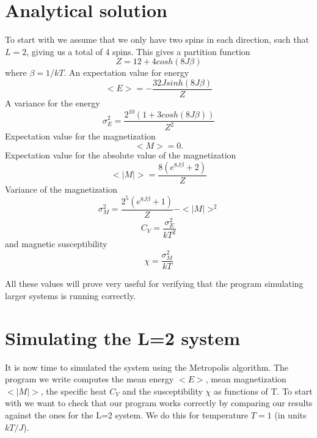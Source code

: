 \documentclass{aa}   %
\begin{document}
\section{Analytical solution}\label{sec:analytical}
To start with we assume that we only have two spins in each direction, such that $L = 2$, giving us a total of 4 spins.
This gives a partition function 
\begin{equation}
 Z = 12 + 4cosh(8J\beta)
\end{equation}
where $\beta = 1/kT$.
An expectation value for energy
\begin{equation}
 <E> = -\frac{32Jsinh(8J\beta)}{Z}
\end{equation}
A variance for the energy
\begin{equation}
 \sigma_E^2 = \frac{2^{10}(1+3cosh(8J\beta))}{Z^2}
\end{equation}
Expectation value for the magnetization
\begin{equation}
 <M> = 0.
\end{equation}
Expectation value for the absolute value of the magnetization
\begin{equation}
 <|M|> = \frac{8(e^{8J\beta}+2)}{Z}
\end{equation}
Variance of the magnetization
\begin{equation}
 \sigma_M^2 = \frac{2^5(e^{8J\beta}+1)}{Z} - <|M|>^2
\end{equation}
\begin{equation}
C_V = \frac{\sigma_E^2}{kT^2}
\end{equation}
and magnetic susceptibility
\begin{equation}
 \chi = \frac{\sigma_M^2}{kT}
\end{equation}

All these values will prove very useful for verifying that the program simulating larger systems is running correctly.

\section{Simulating the L=2 system}\label{sec:simulate_analytic}
It is now time to simulated the system using the Metropolis algorithm. The program we write computes the mean energy $<E>$, mean magnetization $<|M|>$, the specific heat $C_V$ and the susceptibility $\chi$ as functions of T. To start with we want to check that our program works correctly by comparing our results against the ones for the L=2 system. We do this for temperature $T = 1$ (in units $kT/J$).
\end{document}
